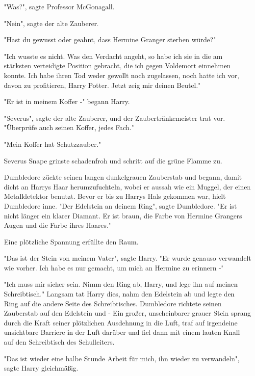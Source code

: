 {"Was?", sagte Professor McGonagall.

"Nein", sagte der alte Zauberer.

"Hast du gewusst oder geahnt, dass Hermine Granger sterben würde?"

"Ich wusste es nicht. Was den Verdacht angeht, so habe ich sie in die am stärksten verteidigte Position gebracht, die ich gegen Voldemort einnehmen konnte. Ich habe ihren Tod weder gewollt noch zugelassen, noch hatte ich vor, davon zu profitieren, Harry Potter. Jetzt zeig mir deinen Beutel."

"Er ist in meinem Koffer -" begann Harry.

"Severus", sagte der alte Zauberer, und der Zaubertränkemeister trat vor. "Überprüfe auch seinen Koffer, jedes Fach."

"Mein Koffer hat Schutzzauber."

Severus Snape grinste schadenfroh und schritt auf die grüne Flamme zu.

Dumbledore zückte seinen langen dunkelgrauen Zauberstab und begann, damit dicht an Harrys Haar herumzufuchteln, wobei er aussah wie ein Muggel, der einen Metalldetektor benutzt. Bevor er bis zu Harrys Hals gekommen war, hielt Dumbledore inne. "Der Edelstein an deinem Ring", sagte Dumbledore. "Er ist nicht länger ein klarer Diamant. Er ist braun, die Farbe von Hermine Grangers Augen und die Farbe ihres Haares."

Eine plötzliche Spannung erfüllte den Raum.

"Das ist der Stein von meinem Vater", sagte Harry. "Er wurde genauso verwandelt wie vorher. Ich habe es nur gemacht, um mich an Hermine zu erinnern -"

"Ich muss mir sicher sein. Nimm den Ring ab, Harry, und lege ihn auf meinen Schreibtisch." Langsam tat Harry dies, nahm den Edelstein ab und legte den Ring auf die andere Seite des Schreibtisches. Dumbledore richtete seinen Zauberstab auf den Edelstein und - Ein großer, unscheinbarer grauer Stein sprang durch die Kraft seiner plötzlichen Ausdehnung in die Luft, traf auf irgendeine unsichtbare Barriere in der Luft darüber und fiel dann mit einem lauten Knall auf den Schreibtisch des Schulleiters.

"Das ist wieder eine halbe Stunde Arbeit für mich, ihn wieder zu verwandeln", sagte Harry gleichmäßig.

}
